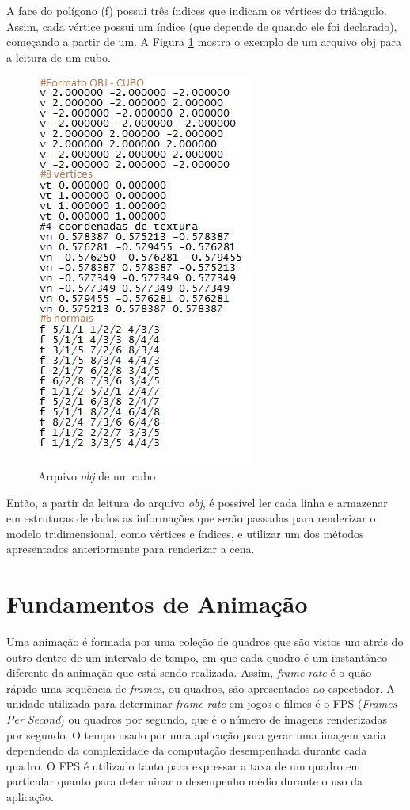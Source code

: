 	A face do polígono (f) possui três índices que indicam os vértices do triângulo. Assim, cada vértice possui um índice (que depende de quando ele foi declarado), começando a partir de um. A Figura \ref{objFile} mostra o exemplo de um arquivo obj para a leitura de um cubo. 

	\begin{figure}[h]
	\centering
		\includegraphics[keepaspectratio=true,scale=0.9]{figuras/obj.jpg}
	\caption{Arquivo \textit{obj} de um cubo}
	\label{objFile}
	\end{figure}

	Então, a partir da leitura do arquivo  \textit{obj}, é possível ler cada linha e armazenar em estruturas de dados as informações que serão passadas para renderizar o modelo tridimensional, como vértices e índices, e utilizar um dos métodos apresentados anteriormente para renderizar a cena. 

\section{Fundamentos de Animação}

	Uma animação é formada por uma coleção de quadros que são vistos um atrás do outro dentro de um intervalo de tempo, em que cada quadro é um instantâneo diferente da animação que está sendo realizada. Assim, \textit{frame rate} é o quão rápido uma sequência de \textit{frames}, ou quadros, são apresentados ao espectador. A unidade utilizada para determinar \textit{frame rate} em jogos e filmes é o FPS (\textit{Frames Per Second}) ou quadros por segundo, que é o número de imagens renderizadas por segundo. O tempo usado por uma aplicação para gerar uma imagem varia dependendo da complexidade da computação desempenhada durante cada quadro.  O FPS é utilizado tanto para expressar a taxa de um quadro em particular quanto para determinar o desempenho médio durante o uso da aplicação. 

